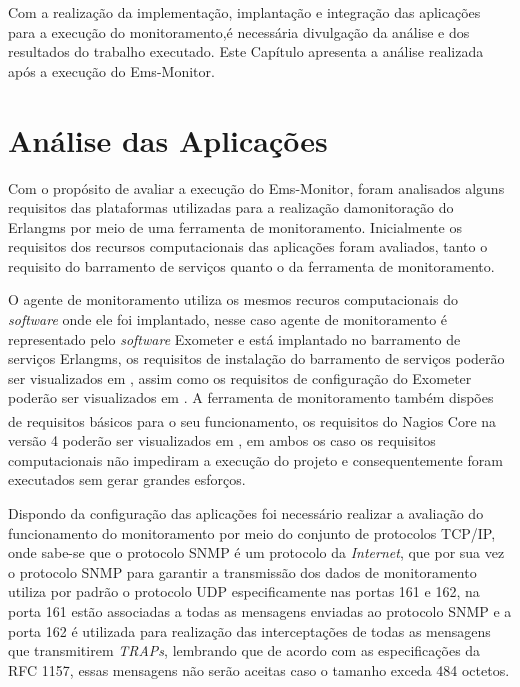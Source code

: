 \label{analise_monitoramento_servicos}

Com a realização da implementação, implantação e integração das aplicações para a execução do monitoramento,é necessária divulgação da análise e dos resultados do trabalho executado. Este Capítulo apresenta a análise realizada após a execução do Ems-Monitor.


\section{Análise das Aplicações}
\label{analise}
Com o propósito de avaliar a execução do Ems-Monitor, foram analisados alguns requisitos das plataformas utilizadas para a realização damonitoração do Erlangms por meio de uma ferramenta de monitoramento. Inicialmente os requisitos dos recursos computacionais das aplicações foram avaliados, tanto o requisito do barramento de serviços quanto o da ferramenta de monitoramento. 

O agente de monitoramento utiliza os mesmos recuros computacionais do \textit{software} onde ele foi implantado, nesse caso agente de monitoramento é representado pelo \textit{software} Exometer e está implantado no barramento de serviços Erlangms, os requisitos de instalação do barramento de serviços poderão ser visualizados em \cite{erlangms_gitHub}, assim como os requisitos de configuração do Exometer poderão ser visualizados em \cite{exometer_gitHub} . A ferramenta de monitoramento também dispões de requisitos básicos para o seu funcionamento, os requisitos do Nagios Core\textsuperscript{\textregistered} na versão 4 poderão ser visualizados em \cite{nagios_core_configuration}, em ambos os caso os requisitos computacionais não impediram a execução do projeto e consequentemente foram executados sem gerar grandes esforços.

Dispondo da configuração das aplicações foi necessário realizar a avaliação do funcionamento do monitoramento por meio do conjunto de protocolos TCP/IP, onde sabe-se que o protocolo \acrshort{SNMP} é um protocolo da \textit{Internet}, que por sua vez o protocolo \acrshort{SNMP} para garantir a transmissão dos dados de monitoramento utiliza por padrão o protocolo UDP especificamente nas portas 161 e 162, na porta 161 estão associadas a todas as mensagens enviadas ao protocolo \acrshort{SNMP} e a porta 162 é utilizada para realização das interceptações de todas as mensagens que transmitirem \textit{TRAPs}, lembrando que de acordo com as especificações da RFC 1157, essas mensagens não serão aceitas caso o tamanho exceda 484 octetos\cite{Schoffstall}. 

